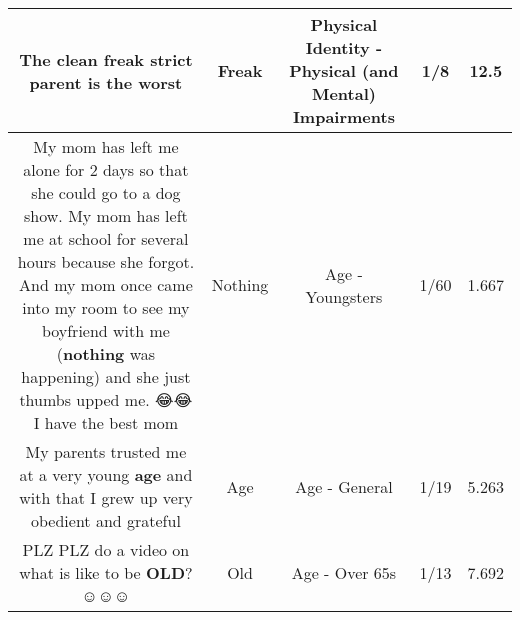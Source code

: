 \documentclass[11pt]{article}
\newlength\mylength
\begin{document}
\begin{center}
\begin{longtable}{|C{.65\mylength}|C{.30\mylength}|C{.12\mylength}|C{.12\mylength}|C{.12\mylength}|}
  \small The clean \textbf{freak} strict parent is the worst\normalsize   & Freak & Physical Identity - Physical (and Mental) Impairments & 1/8 & 12.5 \\  \hline
  \small My mom has left me alone for 2 days so that she could go to a dog show. My mom has left me at school for several hours because she forgot. And my mom once came into my room to see my boyfriend with me (\textbf{nothing} was happening) and she just thumbs upped me. 😂😂 I have the best mom\normalsize   & Nothing & Age - Youngsters & 1/60 & 1.667 \\  \hline
  \small My parents trusted me at a very young \textbf{age} and with that I grew up very obedient and grateful\normalsize   & Age & Age - General & 1/19 & 5.263 \\  \hline
  \small PLZ PLZ do a video on what is like to be \textbf{OLD}? ☺☺☺\normalsize   & Old & Age - Over 65s & 1/13 & 7.692 \\  \hline

\end{longtable}
\end{center}
\end{document}
